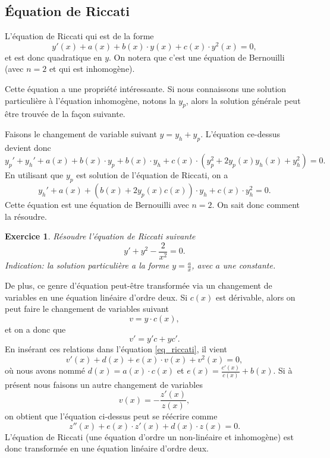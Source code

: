 \documentclass[a4paper,12pt]{book}
\newtheorem*{exercice}{Exercice}
\begin{document}
\subsection{Équation de Riccati}

L'équation de Riccati qui est de la forme
\begin{equation}
 y'(x)+a(x)+b(x)\cdot y(x)+c(x)\cdot y^2(x)=0,\label{eq_riccati}
\end{equation}
et est donc quadratique en $y$. On notera que c'est une équation de Bernouilli (avec $n=2$ et qui est inhomogène).

Cette équation a une propriété intéressante. Si nous connaissons une solution particulière 
à l'équation inhomogène, notons la $y_p$, alors la solution générale peut être trouvée de la façon suivante.

Faisons le changement de variable suivant $y=y_h+y_p$. L'équation ce-dessus devient donc
\begin{equation}
 y_p'+y_h'+a(x)+b(x)\cdot y_p+b(x)\cdot y_h+c(x)\cdot (y_p^2+2y_p(x)y_h(x)+y_h^2)=0.
\end{equation}
En utilisant que $y_p$ est solution de l'équation de Riccati, on a
\begin{equation}
 y_h'+a(x)+(b(x)+2y_p(x)c(x))\cdot y_h+c(x)\cdot y_h^2=0.
\end{equation}
Cette équation est une équation de Bernouilli avec $n=2$. On sait donc comment la résoudre. 

\begin{exercice}
 Résoudre l'équation de Riccati suivante
 \begin{equation}
 y'+y^2-\frac{2}{x^2}=0.
 \end{equation}
Indication: la solution particulière a la forme $y=\frac{a}{x}$, avec $a$ une constante.
\end{exercice}


De plus, ce genre d'équation peut-être transformée via un changement de variables en une équation 
linéaire d'ordre deux. Si $c(x)$ est dérivable, alors on peut faire le changement de variables suivant
\begin{equation}
v=y\cdot c(x),
\end{equation}
et on a donc que 
\begin{equation}
v'=y' c+y c'.
\end{equation}
En insérant ces relations dans l'équation \eqref{eq_riccati}, il vient
\begin{equation}
 v'(x)+d(x)+e(x)\cdot v(x)+v^2(x)=0,\label{eq_riccati_2}
\end{equation}
où nous avons nommé $d(x)=a(x)\cdot c(x)$ et $e(x)=\frac{c'(x)}{c(x)}+b(x)$. Si à présent nous faisons
un autre changement de variables 
\begin{equation}
 v(x)=-\frac{z'(x)}{z(x)},
\end{equation}
on obtient que l'équation ci-dessus peut se réécrire comme
\begin{equation}
 z''(x)+e(x)\cdot z'(x)+d(x)\cdot z(x)=0.\label{eq_riccati_3}
\end{equation}
L'équation de Riccati (une équation d'ordre un non-linéaire et inhomogène) est donc transformée en une équation linéaire d'ordre deux.
\end{document}
